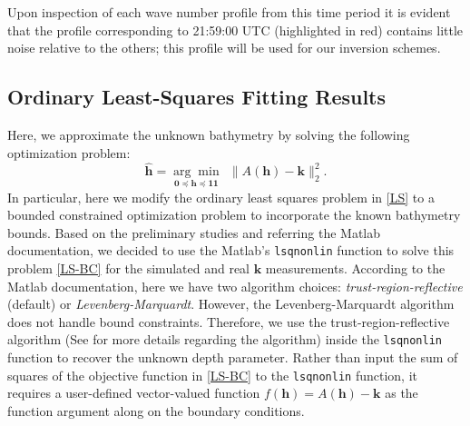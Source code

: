 Upon inspection of each wave number profile from this time period it is evident that the profile corresponding to 21:59:00 UTC (highlighted in red) contains little noise relative to the others; this profile will be used for our inversion schemes.


\subsection{Ordinary Least-Squares Fitting Results}
Here, we approximate the unknown bathymetry by solving the following optimization problem:
\begin{equation}\label{LS-BC}
\mathbf{\hat{h}}= \underset{\mathbf{0} \preceq \mathbf{h} \preceq \mathbf{11} }{\arg \min} \ \  \|  A(\mathbf{h}) -  \mathbf{k} \|_2^2.
\end{equation}
In particular, here we modify the ordinary least squares problem in \eqref{LS} to a bounded constrained optimization problem to incorporate the known bathymetry bounds. Based on the preliminary studies and referring the Matlab documentation, we decided to use the Matlab's \verb|lsqnonlin| function to solve this problem \eqref{LS-BC} for the simulated and real $\mathbf{k}$ measurements. According to the Matlab documentation, here we have two algorithm choices: \textit{trust-region-reflective} (default) or \textit{Levenberg-Marquardt}. However, the Levenberg-Marquardt algorithm does not handle bound constraints. Therefore, we use the trust-region-reflective algorithm (See \cite{trustregion} for more details regarding the algorithm) inside the \verb|lsqnonlin| function to recover the unknown depth parameter. Rather than input the sum of squares of the objective function in \eqref{LS-BC} to the \verb|lsqnonlin| function, it requires a user-defined vector-valued function $f(\mathbf{h}) = A(\mathbf{h}) -  \mathbf{k}$ as the function argument along on the boundary conditions. 

